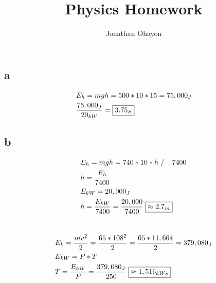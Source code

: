 \documentclass[12pt, oneside]{article}
\title{Physics Homework}
\author{Jonathan Ohayon}
\begin{document}
\maketitle

\section{}
\subsection{a}
\begin{eqnarray*}
& E_h = mgh = 500 * 10 * 15 = 75,000_J\\
& \dfrac{75,000_J}{20_{kW}} = \framebox{$3.75_S$}
\end{eqnarray*}

\subsection{b}
\begin{eqnarray*}
& E_h = mgh = 740 * 10 * h\;/\;:7400\\
& h = \dfrac{E_h}{7400}\\
& E_{kW} = 20,000_J\\
& h = \dfrac{E_{kW}}{7400} = \dfrac{20,000}{7400}\;\framebox{$\approx 2.7_m$}
\end{eqnarray*}

\section{}
\begin{eqnarray*}
& E_k = \dfrac{mv^2}{2} = \dfrac{65 * 108^2}{2} = \dfrac{65 * 11,664}{2} = 379,080_J\\
& E_{kW} = P * T\\
& T = \dfrac{E_{kW}}{P} =\dfrac{379,080_J}{250}\;\framebox{$\approx 1,516_{kWs}$}
\end{eqnarray*}
\end{document}
